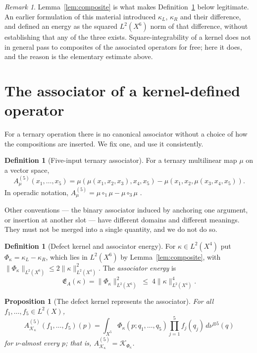 \documentclass[11pt]{amsart}
\newtheorem{proposition}[theorem]{Proposition}
\theoremstyle{definition}
\newtheorem{definition}[theorem]{Definition}
\theoremstyle{remark}
\newtheorem{remark}[theorem]{Remark}
\newcommand{\norm}[1]{\lVert#1\rVert}
\newcommand{\Kop}{\mathcal K}
\newcommand{\Energy}{\mathfrak E}
\begin{document}
\begin{remark}
\label{rem:gapclosed}
Lemma~\ref{lem:composite} is what makes Definition~\ref{def:assockernel} below legitimate.
An earlier formulation of this material introduced $\kappa_L$, $\kappa_R$ and their
difference, and defined an energy as the squared $L^{2}(X^{6})$ norm of that difference,
without establishing that any of the three exists. Square-integrability of a kernel does
not in general pass to composites of the associated operators for free; here it does, and
the reason is the elementary estimate above.
\end{remark}

\section{The associator of a kernel-defined operator}
\label{sec:associator}

For a ternary operation there is no canonical associator without a choice of how the
compositions are inserted. We fix one, and use it consistently.

\begin{definition}[Five-input ternary associator]
\label{def:assoc5}
For a ternary multilinear map $\mu$ on a vector space,
\[
 A^{(5)}_{\mu}(x_1,\ldots,x_5)
 =\mu(\mu(x_1,x_2,x_3),x_4,x_5)-\mu(x_1,x_2,\mu(x_3,x_4,x_5)).
\]
In operadic notation, $A^{(5)}_\mu=\mu\circ_1\mu-\mu\circ_3\mu$ \cite{Yau2016,LodayVallette2012}.
\end{definition}

Other conventions --- the binary associator induced by anchoring one argument, or
insertion at another slot --- have different domains and different meanings. They must not
be merged into a single quantity, and we do not do so.

\begin{definition}[Defect kernel and associator energy]
\label{def:assockernel}
For $\kappa\in L^{2}(X^{4})$ put $\Phi_\kappa=\kappa_L-\kappa_R$, which lies in
$L^{2}(X^{6})$ by Lemma~\ref{lem:composite}, with
$\norm{\Phi_\kappa}_{L^{2}(X^{6})}\le2\norm{\kappa}_{L^{2}(X^{4})}^{2}$. The
\emph{associator energy} is
\[
 \Energy_A(\kappa)=\norm{\Phi_\kappa}_{L^{2}(X^{6})}^{2}
 \;\le\;4\norm{\kappa}_{L^{2}(X^{4})}^{4}.
\]
\end{definition}

\begin{proposition}[The defect kernel represents the associator]
\label{prop:represents}
For all $f_1,\ldots,f_5\in L^{2}(X)$,
\[
 A^{(5)}_{\Kop_\kappa}(f_1,\ldots,f_5)(p)
 =\int_{X^{5}}\Phi_\kappa(p;q_1,\ldots,q_5)\prod_{j=1}^{5}f_j(q_j)\,d\nu^{\otimes5}(q)
\]
for $\nu$-almost every $p$; that is, $A^{(5)}_{\Kop_\kappa}=\Kop_{\Phi_\kappa}$.
\end{proposition}
\end{document}
